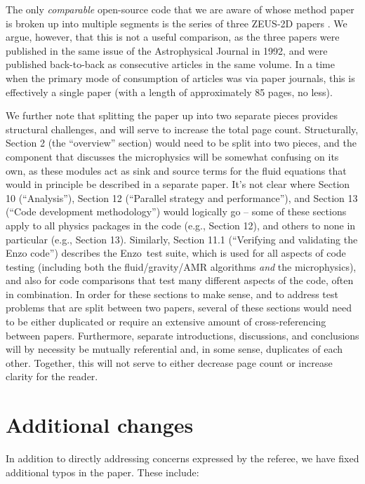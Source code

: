 \documentclass[11pt]{article}
\newcommand{\code}[1]{\textsf{#1}}
\newcommand{\enzo}{\code{Enzo}}
\begin{document}
The only \textit{comparable} open-source code that we are aware of
whose method paper is broken up into multiple segments is the series
of three ZEUS-2D papers \citep{1992ApJS...80..753S,
1992ApJS...80..791S, 1992ApJS...80..819S}.  We argue, however, that
this is not a useful comparison, as the three papers were published in
the same issue of the Astrophysical Journal in 1992, and were
published back-to-back as consecutive articles in the same volume.  In
a time when the primary mode of consumption of articles was via paper
journals, this is effectively a single paper (with a length of
approximately 85 pages, no less).

We further note that splitting the paper up into two separate pieces
provides structural challenges, and will serve to increase the total
page count.  Structurally, Section 2 (the ``overview'' section) would
need to be split into two pieces, and the component that discusses the
microphysics will be somewhat confusing on its own, as these modules
act as sink and source terms for the fluid equations that would in
principle be described in a separate paper.  It's not clear where
Section 10 (``Analysis''), Section 12 (``Parallel strategy and
performance''), and Section 13 (``Code development methodology'')
would logically go -- some of these sections apply to all physics
packages in the code (e.g., Section 12), and others to none in
particular (e.g., Section 13).  Similarly, Section 11.1 (``Verifying
and validating the Enzo code'') describes the \enzo\ test suite, which
is used for all aspects of code testing (including both the
fluid/gravity/AMR algorithms \textit{and} the microphysics), and also
for code comparisons that test many different aspects of the code,
often in combination.  In order for these sections to make sense, and
to address test problems that are split between two papers, several of
these sections would need to be either duplicated or require an
extensive amount of cross-referencing between papers. Furthermore,
separate introductions, discussions, and conclusions will by necessity
be mutually referential and, in some sense, duplicates of each other.
Together, this will not serve to either decrease page count or
increase clarity for the reader.

\section{Additional changes}

In addition to directly addressing concerns expressed by the referee,
we have fixed additional typos in the paper.  These include:
\end{document}
